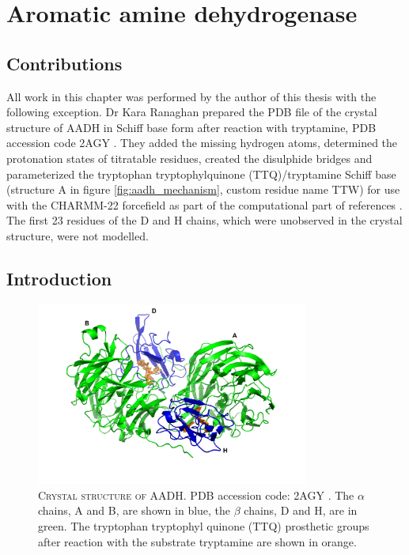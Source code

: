 %
%

\chapter{Aromatic amine dehydrogenase}
\label{chap:aadh}

\section*{Contributions}\label{sec:aadh_contributions}
All work in this chapter was performed by the author of this thesis with the following exception. Dr Kara Ranaghan prepared the PDB file of the crystal structure of AADH in Schiff base form after reaction with tryptamine, PDB accession code 2AGY \cite{masgrauAtomicDescriptionEnzyme2006}. They added the missing hydrogen atoms, determined the protonation states of titratable residues, created the disulphide bridges and parameterized the tryptophan tryptophylquinone (TTQ)/tryptamine Schiff base (structure A in figure \ref{fig:aadh_mechanism}, custom residue name TTW) for use with the CHARMM-22 forcefield \cite{admackerellAllAtomEmpiricalPotential1998} as part of the computational part of references \cite{masgrauAtomicDescriptionEnzyme2006, masgrauTunnelingClassicalPaths2007, ranaghanInitioQMMM2017}.  The first 23 residues of the D and H chains, which were unobserved in the crystal structure, were not modelled.

\section{Introduction}
\begin{figure}
    \centering
    \includegraphics[width=0.8\textwidth]{chapters/aadh/figures/aadh_full_structure.png}
    \caption[Crystal structure of AADH]{\textsc{Crystal structure of AADH}. PDB accession code: 2AGY \cite{masgrauAtomicDescriptionEnzyme2006}. The $\alpha$ chains, A and B, are shown in blue, the $\beta$ chains, D and H, are in green. The tryptophan tryptophyl quinone (TTQ) prosthetic groups after reaction with the substrate tryptamine are shown in orange.}
    \label{fig:aadh_full_structure}
\end{figure}

